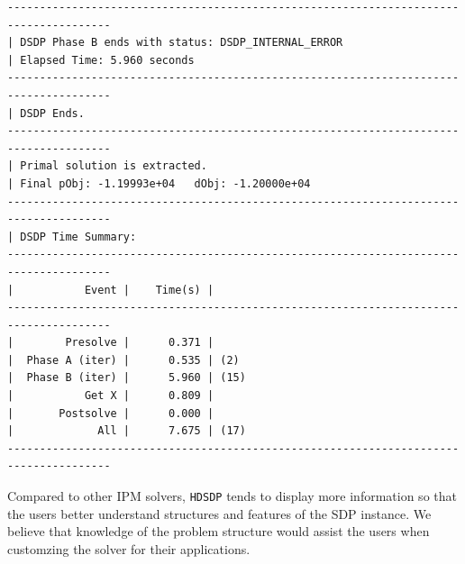 \begin{lstlisting}
--------------------------------------------------------------------------------------
| DSDP Phase B ends with status: DSDP_INTERNAL_ERROR                                               
| Elapsed Time: 5.960 seconds                                                                   
--------------------------------------------------------------------------------------
| DSDP Ends.                                                                                        
--------------------------------------------------------------------------------------
| Primal solution is extracted.                                                                    
| Final pObj: -1.19993e+04   dObj: -1.20000e+04 
--------------------------------------------------------------------------------------
| DSDP Time Summary: 
--------------------------------------------------------------------------------------
|           Event |    Time(s) | 
--------------------------------------------------------------------------------------
|        Presolve |      0.371 | 
|  Phase A (iter) |      0.535 | (2) 
|  Phase B (iter) |      5.960 | (15) 
|           Get X |      0.809 | 
|       Postsolve |      0.000 | 
|             All |      7.675 | (17) 
--------------------------------------------------------------------------------------
\end{lstlisting}

Compared to other IPM solvers, {{\texttt{HDSDP}}} tends to display more information so that the users better 
understand structures and features of the SDP instance. We believe that knowledge of
the problem structure would assist the users when customzing the solver for their applications.
